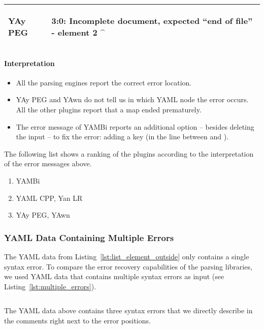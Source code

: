 \begin{table}[H]
\begin{tabular}{lp{}}
    \vspace{0cm}
    YAy PEG &
    \vspace{-0.36cm}
    \begin{textcode}
      3:0: Incomplete document, expected “end of file”
           - element 2
           ^
    \end{textcode}
    \\

    \bottomrule

  \end{tabular}
\end{table}

\paragraph{Interpretation}

\begin{itemize}
  \item All the parsing engines report the correct error location.
  \item YAy PEG and YAwn do not tell us in which YAML node the error occurs. All the other plugins report that a map ended prematurely.
  \item The error message of YAMBi reports an additional option – besides deleting the input – to fix the error: adding a key (in the line between  and ).
\end{itemize}

The following list shows a ranking of the plugins according to the interpretation of the error messages above.

\begin{enumerate}
  \item YAMBi
  \item YAML CPP, Yan LR
  \item YAy PEG, YAwn
\end{enumerate}

\subsubsection{YAML Data Containing Multiple Errors}

The YAML data from Listing~\ref{lst:list_element_outside} only contains a single syntax error. To compare the error recovery capabilities of the parsing libraries, we used YAML data that contains multiple syntax errors as input (see Listing~\ref{lst:multiple_errors}).

\begin{listing}
  \begin{code-boxed}
    \inputminted[linenos]{yaml}{Data/Errors/multiple_errors.yaml}
  \end{code-boxed}
  \caption{The YAML data above contains three syntax errors that we directly describe in the comments right next to the error positions.}
  \label{lst:multiple_errors}
\end{listing}

